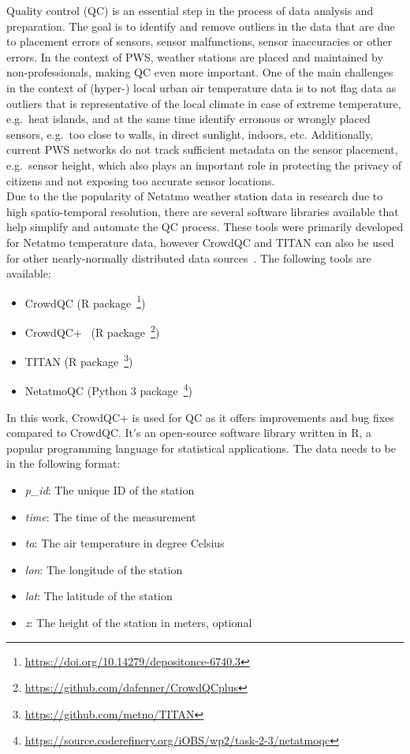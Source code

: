 Quality control (QC) is an essential step in the process of data analysis and preparation. The goal is to identify and remove outliers in the data that are due to placement errors of sensors, sensor malfunctions, sensor inaccuracies or other errors. In the context of PWS, weather stations are placed and maintained by non-professionals, making QC even more important. One of the main challenges in the context of (hyper-) local urban air temperature data is to not flag data as outliers that is representative of the local climate in case of extreme temperature, e.g.\ heat islands, and at the same time identify erronous or wrongly placed sensors, e.g.\ too close to walls, in direct sunlight, indoors, etc. Additionally, current PWS networks do not track sufficient metadata on the sensor placement, e.g.\ sensor height, which also plays an important role in protecting the privacy of citizens and not exposing too accurate sensor locations.\\
Due to the the popularity of Netatmo weather station data in research due to high spatio-temporal resolution, there are several software libraries available that help simplify and automate the QC process. These tools were primarily developed for Netatmo temperature data, however CrowdQC and TITAN can also be used for other nearly-normally distributed data sources~\cite{hahn2022observations}. The following tools are available:

\begin{itemize}
    \item CrowdQC (R package~\footnote{\url{https://doi.org/10.14279/depositonce-6740.3}})
    \item CrowdQC+~\cite{fenner2021crowdqc+} (R package~\footnote{\url{https://github.com/dafenner/CrowdQCplus}})
    \item TITAN (R package~\footnote{\url{https://github.com/metno/TITAN}})
    \item NetatmoQC (Python 3 package~\footnote{\url{https://source.coderefinery.org/iOBS/wp2/task-2-3/netatmoqc}})
\end{itemize}

In this work, CrowdQC+ is used for QC as it offers improvements and bug fixes compared to CrowdQC. It's an open-source software library written in R, a popular programming language for statistical applications. The data needs to be in the following format:

\begin{itemize}
    \item \textit{p\_id}: The unique ID of the station
    \item \textit{time}: The time of the measurement
    \item \textit{ta}: The air temperature in degree Celsius
    \item \textit{lon}: The longitude of the station
    \item \textit{lat}: The latitude of the station
    \item \textit{z}: The height of the station in meters, optional
\end{itemize}

